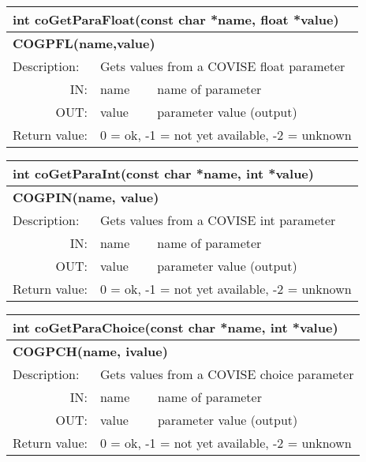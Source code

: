 \begin{htmlonly}
\begin{longtable}{|p{4cm}|p{2.5cm}|p{7cm}|}
\hline
\multicolumn{3}{|p{13.5cm}|}{\bf int coGetParaFloat(const char *name, float *value)} \\
\hline
\multicolumn{3}{|p{13.5cm}|}{\bf COGPFL(name,value)}  \\
\hline
\hline
{Description:}  
           & \multicolumn{2}{|p{9.5cm}|}{Gets values from a COVISE float parameter} \\
\hline
\multicolumn{1}{|r|}{IN:} & {name} 
                          & {name of parameter}\\
\hline
\multicolumn{1}{|r|}{OUT:} & {value} 
                           & {parameter value (output)}\\
\hline
{Return value:}  
  & \multicolumn{2}{|p{9.5cm}|}{0 = ok, -1 = not yet available, -2 = unknown} \endhead
\hline
\end{longtable}

\begin{longtable}{|p{4cm}|p{2.5cm}|p{7cm}|}
\hline
\multicolumn{3}{|p{13.5cm}|}{\bf int coGetParaInt(const char *name, int *value)}  \\
\hline
\multicolumn{3}{|p{13.5cm}|}{\bf COGPIN(name, value)}  \\
\hline
\hline
{Description:}  
           & \multicolumn{2}{|p{9.5cm}|}{Gets values from a COVISE int parameter} \\
\hline
\multicolumn{1}{|r|}{IN:} & {name} 
                          & {name of parameter}\\
\hline
\multicolumn{1}{|r|}{OUT:} & {value} 
                           & {parameter value (output)}\\
\hline
{Return value:}  
  & \multicolumn{2}{|p{9.5cm}|}{0 = ok, -1 = not yet available, -2 = unknown} \endhead
\hline
\end{longtable}

\begin{longtable}{|p{4cm}|p{2.5cm}|p{7cm}|}
\hline
\multicolumn{3}{|p{13.5cm}|}{\bf int coGetParaChoice(const char *name, int *value)}\\
\hline
\multicolumn{3}{|p{13.5cm}|}{\bf COGPCH(name, ivalue)}  \\
\hline
\hline
{Description:}  
           & \multicolumn{2}{|p{9.5cm}|}{Gets values from a COVISE choice parameter} \\
\hline
\multicolumn{1}{|r|}{IN:} & {name} 
                          & {name of parameter}\\
\hline
\multicolumn{1}{|r|}{OUT:} & {value} 
                           & {parameter value (output)}\\
\hline
{Return value:}  
  & \multicolumn{2}{|p{9.5cm}|}{0 = ok, -1 = not yet available, -2 = unknown} \endhead
\hline
\end{longtable}


\end{htmlonly}
